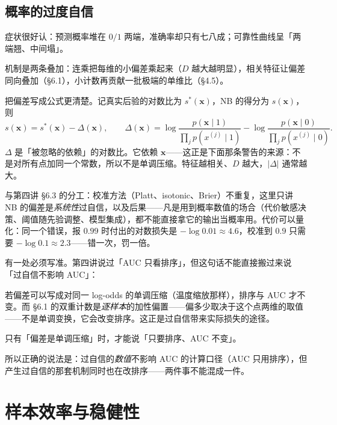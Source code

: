 \documentclass[11pt,a4paper,fontset=windows,zihao=-4]{ctexart}
\newcommand{\bx}{\mathbf{x}}
\begin{document}
\subsection{概率的过度自信}

症状很好认：预测概率堆在 $0/1$ 两端，准确率却只有七八成；可靠性曲线呈「两端翘、中间塌」。

机制是两条叠加：连乘把每维的小偏差乘起来（$D$ 越大越明显），相关特征让偏差同向叠加（§6.1），小计数再贡献一批极端的单维比（§4.5）。

把偏差写成公式更清楚。记真实后验的对数比为 $s^{\ast}(\bx)$，NB 的得分为 $s(\bx)$，则
\begin{equation}
  s(\bx)=s^{\ast}(\bx)-\Delta(\bx),\qquad
  \Delta(\bx)=\log\frac{p(\bx\mid1)}{\prod_jp(x^{(j)}\mid1)}
  -\log\frac{p(\bx\mid0)}{\prod_jp(x^{(j)}\mid0)} .
  \label{eq:gap}
\end{equation}
$\Delta$ 是「被忽略的依赖」的对数比。它依赖 $\bx$——这正是下面那条警告的来源：不是对所有点加同一个常数，所以不是单调压缩。特征越相关、$D$ 越大，$|\Delta|$ 通常越大。

与第四讲 §6.3 的分工：校准方法（Platt、isotonic、Brier）不重复，这里只讲 NB 的偏差是\emph{系统性}过自信，以及后果——凡是用到概率数值的场合（代价敏感决策、阈值随先验调整、模型集成），都不能直接拿它的输出当概率用。代价可以量化：同一个错误，报 $0.99$ 时付出的对数损失是 $-\log0.01\approx4.6$，校准到 $0.9$ 只需要 $-\log0.1\approx2.3$——错一次，罚一倍。

有一处必须写准。第四讲说过「AUC 只看排序」，但这句话不能直接搬过来说「过自信不影响 AUC」：

\begin{warn}[排序不变是有条件的]
若偏差可以写成对同一 log-odds 的单调压缩（温度缩放那样），排序与 AUC 才不变。而 §6.1 的双重计数是\emph{逐样本}的加性偏置——偏多少取决于这个点两维的取值——不是单调变换，它会改变排序。这正是过自信带来实际损失的途径。

只有「偏差是单调压缩」时，才能说「只要排序、AUC 不变」。
\end{warn}

所以正确的说法是：过自信的\emph{数值}不影响 AUC 的计算口径（AUC 只用排序），但产生过自信的那套机制同时也在改排序——两件事不能混成一件。


\section{样本效率与稳健性}
\end{document}

